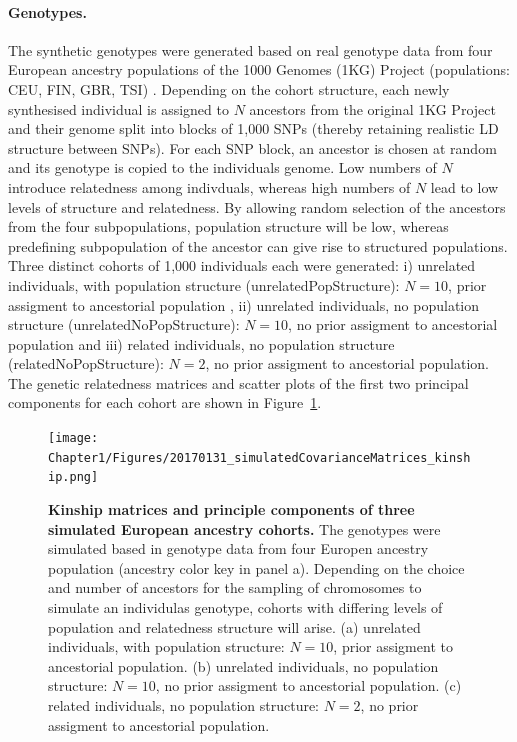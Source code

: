 \paragraph{Genotypes.} \label{paragraph:genotypes}
The synthetic genotypes were generated based on real genotype data from four European ancestry populations of the 1000 Genomes (1KG) Project (populations: CEU, FIN, GBR, TSI) \citep{Abecasis2012}. Depending on the cohort structure, each newly synthesised individual is assigned to \(N\) ancestors from the original 1KG Project and their genome split into blocks of 1,000 SNPs (thereby retaining realistic LD structure between SNPs). For each SNP block, an ancestor is chosen at random and its genotype is copied to the individuals genome. Low numbers of \(N\) introduce relatedness among indivduals, whereas high numbers of \(N\) lead to low levels of structure and relatedness. By allowing random selection of the ancestors from the four subpopulations, population structure will be low, whereas predefining subpopulation of the ancestor can give rise to structured populations. Three distinct cohorts of 1,000 individuals each were generated: i) unrelated individuals, with population structure (unrelatedPopStructure): \(N=10\), prior assigment to ancestorial population , ii) unrelated individuals, no population structure (unrelatedNoPopStructure): \(N=10\), no prior assigment to ancestorial population and iii) related individuals, no population structure (relatedNoPopStructure): \(N=2\), no prior assigment to ancestorial population.  The genetic relatedness matrices and scatter plots of the first two principal components for each cohort are shown in Figure~\ref{fig:kinship-matrices}. 


\begin{figure}[!h]
	\centering
	\texttt{[image: Chapter1/Figures/20170131\_simulatedCovarianceMatrices\_kinship.png]}
	\caption[Kinship matrices and principle components of three simulated European ancestry cohorts]{\textbf{Kinship matrices and principle components of three simulated European ancestry cohorts.} The genotypes were simulated based in genotype data from four Europen ancestry population (ancestry color key in panel a). Depending on the choice and number of ancestors for the sampling of chromosomes to simulate an individulas genotype, cohorts with differing levels of population and relatedness structure will arise. (a) unrelated individuals, with population structure: \(N=10\), prior assigment to ancestorial population. (b) unrelated individuals, no population structure: \(N=10\), no prior assigment to ancestorial population. (c) related individuals, no population structure: \(N=2\), no prior assigment to ancestorial population.}
 	\label{fig:kinship-matrices}
\end{figure}


